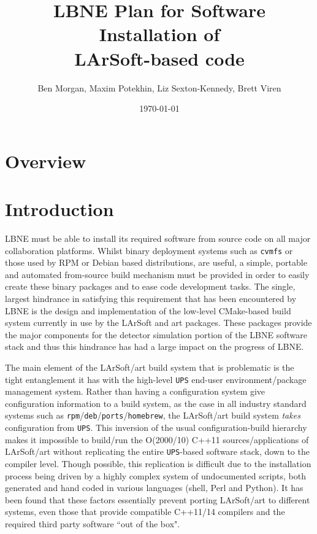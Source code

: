 \documentclass[usletter]{article}
\newcommand{\code}[1]{\texttt{#1}}
\newcommand{\ups}{\code{UPS}\xspace}
\newcommand{\art}{art\xspace}
\newcommand{\larsoft}{LArSoft\xspace}
\begin{document}
\title{LBNE Plan for Software Installation of\\
  LArSoft-based code}
\author{Ben Morgan, Maxim Potekhin, Liz Sexton-Kennedy, Brett Viren}
\date{\today}
\maketitle
\tableofcontents

\section{Overview}

\section{Introduction}
LBNE must be able to install its required software from source code on
all major collaboration platforms\cite{docdb8035}.  Whilst binary
deployment systems such as \code{cvmfs} or those used by RPM or Debian
based distributions, are useful, a simple, portable and automated
from-source build mechanism must be provided in order to easily create
these binary packages and to ease code development tasks. The single,
largest hindrance in satisfying this requirement that has been
encountered by LBNE is the design and implementation of the low-level
CMake-based build system currently in use by the \larsoft and \art
packages.  These packages provide the major components for the
detector simulation portion of the LBNE software stack and thus this
hindrance has had a large impact on the progress of LBNE.

The main element of the \larsoft/\art build system that is problematic
is the tight entanglement it has with the high-level \ups end-user
environment/package management system. Rather than having a configuration system
give configuration information to a build system, as the case in all industry
standard systems such as \code{rpm}/\code{deb}/\code{ports}/\code{homebrew}, the \larsoft/\art
build system \textit{takes} configuration from \ups. This inversion of the usual
configuration-build hierarchy makes it impossible to build/run
the O(2000/10) C++11 sources/applications of \larsoft/\art
without replicating the entire \ups-based software stack, down to the compiler
level. Though possible, this replication is difficult due to the installation
process being driven by a highly complex system of undocumented scripts, both
generated and hand coded in various languages (shell, Perl and Python).
It has been found that these factors essentially prevent porting \larsoft/\art
to different systems, even those that provide compatible C++11/14 compilers
and the required third party software ``out of the box".
\end{document}
